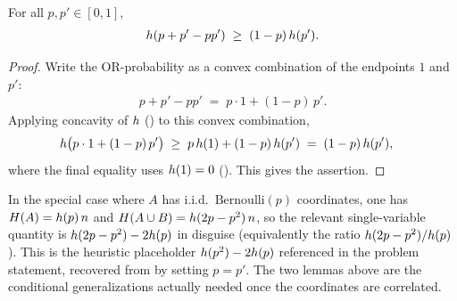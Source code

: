 \begin{lemma}
\label{lem:concavity-mix}
For all $p, p' \in [0, 1]$,
\begin{align*}
h(p + p' - p p') \;\ge\; (1 - p)\,h(p').
\end{align*}
\end{lemma}

\begin{proof}
Write the OR-probability as a convex combination of the endpoints $1$ and $p'$:
\begin{align*}
p + p' - p p' \;=\; p \cdot 1 + (1 - p)\, p'.
\end{align*}
Applying concavity of $h$ () to this convex combination,
\begin{align*}
h\bigl(p \cdot 1 + (1 - p)\, p'\bigr)
&\;\ge\; p\,h(1) + (1 - p)\,h(p')
\;=\; (1 - p)\,h(p'),
\end{align*}
where the final equality uses $h(1) = 0$ (). This
gives the assertion.
\end{proof}

\begin{remark}
\label{rem:placeholder}
In the special case where $A$ has i.i.d.\ $\mathrm{Bernoulli}(p)$ coordinates,
one has $H(A) = h(p)\,n$ and $H(A \cup B) = h(2p - p^2)\,n$, so the
relevant single-variable quantity is $h(2p - p^2) - 2h(p)$ in disguise
(equivalently the ratio $h(2p - p^2)/h(p)$). This is the heuristic
placeholder $h(p^2) - 2h(p)$ referenced in the problem statement, recovered
from  by setting $p = p'$. The two lemmas above are the
conditional generalizations actually needed once the coordinates are correlated.
\end{remark}

